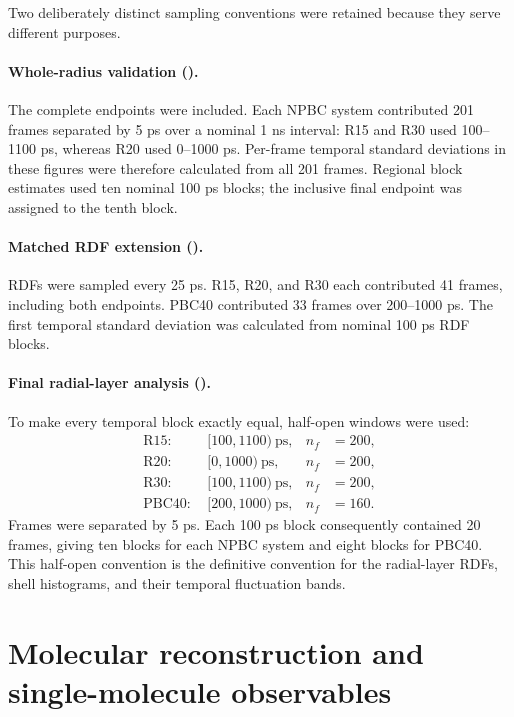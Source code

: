 \documentclass[11pt]{article}
\begin{document}
Two deliberately distinct sampling conventions were retained because they
serve different purposes.

\paragraph{Whole-radius validation ().}
The complete endpoints were included.  Each NPBC system contributed 201
frames separated by 5 ps over a nominal 1 ns interval:
R15 and R30 used 100--1100 ps, whereas R20 used 0--1000 ps.  Per-frame
temporal standard deviations in these figures were therefore calculated from
all 201 frames.  Regional block estimates used ten nominal 100 ps blocks; the
inclusive final endpoint was assigned to the tenth block.

\paragraph{Matched RDF extension ().}
RDFs were sampled every 25 ps.  R15, R20, and R30 each contributed 41 frames,
including both endpoints.  PBC40 contributed 33 frames over 200--1000 ps.
The first temporal standard deviation was calculated from nominal 100 ps RDF
blocks.

\paragraph{Final radial-layer analysis ().}
To make every temporal block exactly equal, half-open windows were used:
\begin{align}
 \mathrm{R15}:&\ [100,1100)\ \mathrm{ps}, & n_f&=200,\\
 \mathrm{R20}:&\ [0,1000)\ \mathrm{ps},   & n_f&=200,\\
 \mathrm{R30}:&\ [100,1100)\ \mathrm{ps},& n_f&=200,\\
 \mathrm{PBC40}:&\ [200,1000)\ \mathrm{ps},& n_f&=160.
\end{align}
Frames were separated by 5 ps.  Each 100 ps block consequently contained 20
frames, giving ten blocks for each NPBC system and eight blocks for PBC40.
This half-open convention is the definitive convention for the radial-layer
RDFs, shell histograms, and their temporal fluctuation bands.

\section{Molecular reconstruction and single-molecule observables}
\end{document}
